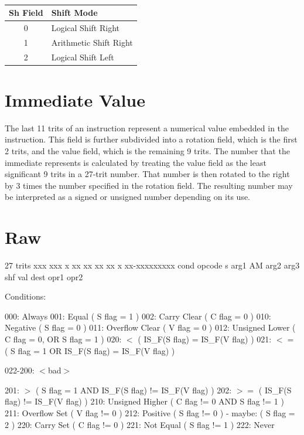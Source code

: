 \documentclass[12pt]{article}
\begin{document}
\begin{table}[h!]
    \centering
    \caption{}
    \label{tab:Shift Modes}
    \begin{tabular}{|c|l|}
        \hline
        \textbf{Sh} Field & Shift Mode \\ \hline
        0 & Logical Shift Right \\ \hline
        1 & Arithmetic Shift Right \\ \hline
        2 & Logical Shift Left \\ \hline
    \end{tabular}
\end{table}

\section{Immediate Value} \label{sec:Immediate Value}

The last 11 trits of an instruction represent a numerical value embedded in the
instruction. This field is further subdivided into a rotation field, which is the
first 2 trits, and the value field, which is the remaining 9 trits. The number that
the immediate represents is calculated by treating the value field as the least
significant 9 trits in a 27-trit number. That number is then rotated to the right
by 3 times the number specified in the rotation field. The resulting number may be 
interpreted as a signed or unsigned number depending on its use.

\section{Raw} \label{sec:Raw}
    
27 trits
  xxx   xxx  x  xx  xx  xx   xx   x  xx-xxxxxxxxx
 cond opcode s arg1 AM arg2 arg3 shf  val 
               dest    opr1 opr2
    
Conditions:
    
    000:    Always
    001:    Equal ( S flag = 1 )
    002:    Carry Clear ( C flag = 0 )
    010:    Negative ( S flag = 0 )
    011:    Overflow Clear ( V flag = 0 )
    012:    Unsigned Lower ( C flag = 0, OR S flag = 1 )
    020:    $<$ ( IS\_F(S flag) = IS\_F(V flag) )    
    021:    $<=$ ( S flag = 1 OR IS\_F(S flag) = IS\_F(V flag) )
    
    022-200:   $<$bad$>$
    
    201:    $>$ ( S flag = 1 AND IS\_F(S flag) != IS\_F(V flag) )
    202:    $>=$ ( IS\_F(S flag) != IS\_F(V flag) )
    210:    Unsigned Higher ( C flag != 0 AND S flag != 1 )
    211:    Overflow Set ( V flag != 0 )
    212:    Positive ( S flag != 0 ) - maybe: ( S flag = 2 )
    220:    Carry Set ( C flag != 0 )
    221:    Not Equal ( S flag != 1 )
    222:    Never
        
\end{document}
